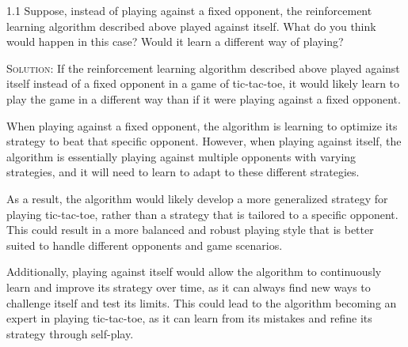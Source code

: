 \documentclass{article}
\begin{document}
1.1 Suppose, instead of playing against a fixed opponent, the 
reinforcement learning algorithm described above played against itself. What do you 
think would happen in this case? Would it learn a different way of playing?

\textsc{Solution:} If the reinforcement learning algorithm described above played against itself instead of a fixed opponent in a game of tic-tac-toe, it would likely learn to play the game in a different way than if it were playing against a fixed opponent.

When playing against a fixed opponent, the algorithm is learning to optimize its strategy to beat that specific opponent. However, when playing against itself, the algorithm is essentially playing against multiple opponents with varying strategies, and it will need to learn to adapt to these different strategies.

As a result, the algorithm would likely develop a more generalized strategy for playing tic-tac-toe, rather than a strategy that is tailored to a specific opponent. This could result in a more balanced and robust playing style that is better suited to handle different opponents and game scenarios.

Additionally, playing against itself would allow the algorithm to continuously learn and improve its strategy over time, as it can always find new ways to challenge itself and test its limits. This could lead to the algorithm becoming an expert in playing tic-tac-toe, as it can learn from its mistakes and refine its strategy through self-play.
\end{document}
